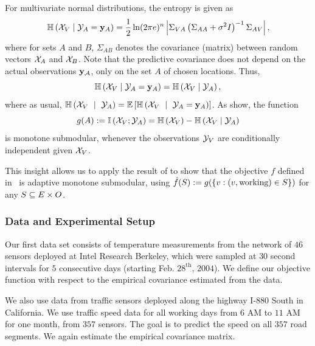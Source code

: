 \noindent For multivariate normal distributions, the entropy is given as
$$\mathbb{H} \left( { {\mathcal{X}}_{V}\mid{\mathcal{Y}}_{A} = {\mathbf{y}}_{A} } \right) =\frac{1}{2}\ln (2\pi e)^{n}\left| \Sigma_{V A}\left(\Sigma_{AA}+\sigma^{2} I\right)^{-1}\Sigma_{A V}\right|,$$
where for sets $A$ and $B$, $\Sigma_{AB}$ denotes the covariance (matrix) between random vectors ${\mathcal{X}}_{A}$ and ${\mathcal{X}}_{B}$. Note that the predictive covariance does not depend on the actual observations ${\mathbf{y}}_{{\mathcal{A}}}$, only on the set $A$ of chosen locations. Thus,
$$\mathbb{H} \left( { {\mathcal{X}}_{V}\mid{\mathcal{Y}}_{A} = {\mathbf{y}}_{A} } \right)  = \mathbb{H} \left( { {\mathcal{X}}_{V}\mid{\mathcal{Y}}_{A}} \right) ,$$
where as usual, 
$\mathbb{H} \left( { {\mathcal{X}}_{V} \  \mid \ {\mathcal{Y}}_{A}} \right)  = \mathbb{E}\left[ \mathbb{H} \left( {
    {\mathcal{X}}_{V} \  \mid \ {\mathcal{Y}}_{A}= {\mathbf{y}}_A } \right)  \right]$.
As \citet{Krause05a} show, the function
\begin{equation}
  \label{eq:experiments-infogain}
  g(A) := \mathbb{I} \left( {{{\mathcal{X}}_{V}} ; {{\mathcal{Y}}_{A}}} \right) =\mathbb{H} \left( {{\mathcal{X}}_{V}} \right) -\mathbb{H} \left( {{\mathcal{X}}_{V}\mid{\mathcal{Y}}_{A}} \right) 
\end{equation}
is monotone submodular, whenever the observations ${\mathcal{Y}}_{V}$ are conditionally independent given ${\mathcal{X}}_{V}$.

This insight allows us to apply the result of
 to show that the objective $f$ defined in~
is adaptive monotone submodular, using 
$\hat{f}(S) := g(\left\{v : (v, \text{working}) \in S\right\})$ for
any $S \subseteq E \times O$.


\subsubsection{Data and Experimental Setup}

Our first data set consists of temperature measurements from the network of $46$ sensors deployed at Intel Research Berkeley, which were sampled  at $30$ second intervals for $5$ consecutive days (starting Feb. $28^{\text{th}}$, $2004$). We define our objective function with respect to the empirical covariance estimated from the data.

We also use data from traffic sensors deployed along the highway I-$880$ South in California. We use traffic speed data for all working days from $6$ AM to $11$ AM for one month, from $357$ sensors. The goal is to predict the speed on all $357$ road segments. We again estimate the empirical covariance matrix.



